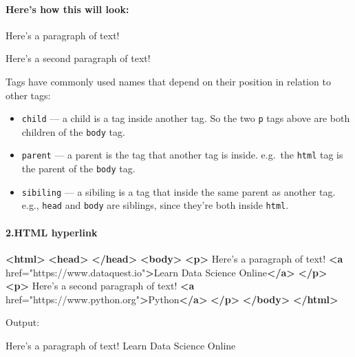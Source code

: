 \documentclass[11pt]{article}
\providecommand{\tightlist}{%
      \setlength{\itemsep}{0pt}\setlength{\parskip}{0pt}}
\newenvironment{Shaded}{}{}
\newcommand{\KeywordTok}[1]{\textcolor[rgb]{0.00,0.44,0.13}{\textbf{{#1}}}}
\newcommand{\StringTok}[1]{\textcolor[rgb]{0.25,0.44,0.63}{{#1}}}
\newcommand{\OtherTok}[1]{\textcolor[rgb]{0.00,0.44,0.13}{{#1}}}
\newcommand{\NormalTok}[1]{{#1}}
\begin{document}
\hypertarget{heres-how-this-will-look}{%
\paragraph{Here's how this will look:}\label{heres-how-this-will-look}}

Here's a paragraph of text!

Here's a second paragraph of text!

Tags have commonly used names that depend on their position in relation
to other tags:

\begin{itemize}
\tightlist
\item
  \texttt{child} --- a child is a tag inside another tag. So the two
  \texttt{p} tags above are both children of the \texttt{body} tag.
\item
  \texttt{parent} --- a parent is the tag that another tag is inside.
  e.g.~the \texttt{html} tag is the parent of the \texttt{body} tag.
\item
  \texttt{sibiling} --- a sibiling is a tag that inside the same parent
  as another tag. e.g., \texttt{head} and \texttt{body} are siblings,
  since they're both inside \texttt{html}.
\end{itemize}

    \hypertarget{html-hyperlink}{%
\paragraph{2.HTML hyperlink}\label{html-hyperlink}}

\begin{Shaded}
\begin{Highlighting}[]
\KeywordTok{<html>}
    \KeywordTok{<head>}
    \KeywordTok{</head>}
    \KeywordTok{<body>}
        \KeywordTok{<p>}
\NormalTok{            Here's a paragraph of text!}
            \KeywordTok{<a}\OtherTok{ href=}\StringTok{"https://www.dataquest.io"}\KeywordTok{>}\NormalTok{Learn Data Science Online}\KeywordTok{</a>}
        \KeywordTok{</p>}
        \KeywordTok{<p>}
\NormalTok{            Here's a second paragraph of text!}
            \KeywordTok{<a}\OtherTok{ href=}\StringTok{"https://www.python.org"}\KeywordTok{>}\NormalTok{Python}\KeywordTok{</a>}
        \KeywordTok{</p>}
    \KeywordTok{</body>}
\KeywordTok{</html>}
\end{Highlighting}
\end{Shaded}

Output:

Here's a paragraph of text! Learn Data Science Online
\end{document}
